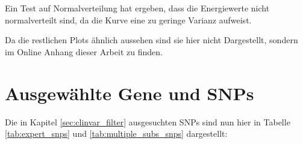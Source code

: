 Ein Test auf Normalverteilung  hat ergeben, dass die Energiewerte nicht normalverteilt sind, da die Kurve eine zu geringe Varianz aufweist. 

Da die restlichen Plots ähnlich aussehen sind sie hier nicht Dargestellt, sondern im Online Anhang dieser Arbeit zu finden.


\section{Ausgewählte Gene und \ac{SNP}s}

Die in Kapitel \ref{sec:clinvar_filter} ausgesuchten \ac{SNP}s sind nun hier in Tabelle \ref{tab:expert_snps} und \ref{tab:multiple_subs_snps} dargestellt:

\begin{table}[]
    \centering
    \caption{Tabelle aller Gene des \emph{expert panels} mit mindestens 10 Pathogenen \ac{SNP}s. Die verwendeten Gene sind grün markiert.}
    \label{tab:expert_snps}
\end{table}


